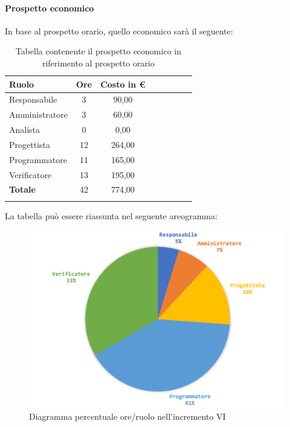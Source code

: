 			\paragraph{Prospetto economico}
			In base al prospetto orario, quello economico sarà il seguente: 
			\begin{longtable}{|l|c|c|c|c|c|c|c|}
				\hline
				\rowcolor{lighter-grayer}
				\textbf{Ruolo} & \textbf{Ore} & \textbf{Costo in € } \\
				\hline
				\endfirsthead
				
				\hline
				Responsabile 	    & 3 & 90,00\\
				\hline 
				\hline
				Amministratore	   & 3 & 60,00\\
				\hline
				\hline
				Analista 				& 0 & 0,00\\
				\hline
				\hline
				Progettista 		   & 12 & 264,00\\
				\hline
				\hline
				Programmatore 	  & 11 & 165,00\\
				\hline
				\hline
				Verificatore 		   & 13 & 195,00\\
				\hline
				\textbf{Totale} 	 & 42 & 774,00\\
				\hline
				\caption{Tabella contenente il prospetto economico in riferimento al prospetto orario}
			\end{longtable}
		
				La tabella può essere riassunta nel seguente areogramma:
			\begin{figure}[H]
				\centering
				\includegraphics[width=0.8\linewidth]{./images/preventivo/incremento6-2.png}
				\caption{Diagramma percentuale ore/ruolo nell'incremento VI}
				\label{fig:consuntivo diagramma costi ruolo incremento VI}
			\end{figure}
		
